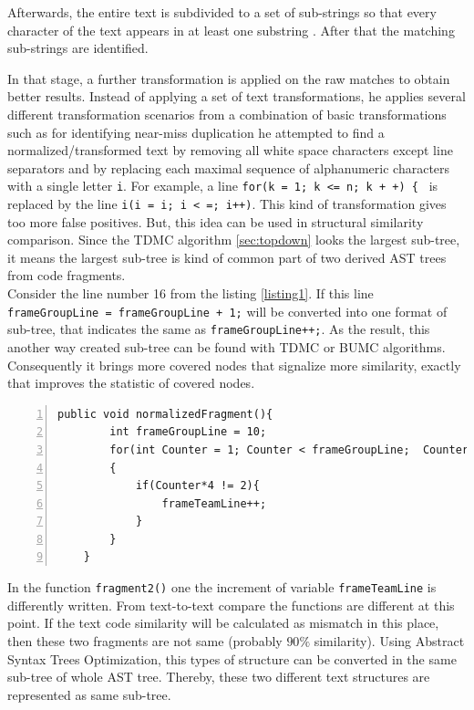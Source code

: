\documentclass{report}
\begin{document}
Afterwards, the entire text
is subdivided to a set of sub-strings so that every character of the text appears in at least
one substring \cite{software_clone_detection}. After that the matching sub-strings are identified. 

In that stage, a further transformation is applied on the raw matches to obtain better results. Instead of applying
a set of text transformations, he applies several different transformation scenarios
from a combination of basic transformations such as for identifying near-miss duplication he
attempted to find a normalized/transformed text by removing all white space characters
except line separators and by replacing each maximal sequence of alphanumeric characters
with a single letter \texttt{i}. For example, a line \texttt{for(k = 1; k <= n; k + +) \{ } is replaced by
the line \texttt{i(i = i; i < =; i++)}. This kind of transformation gives too more false positives. But, this idea can be used in structural similarity comparison. Since the TDMC algorithm \ref{sec:topdown} looks the largest sub-tree, it means the largest sub-tree is kind of common part of two derived AST trees from code fragments. \\
Consider the line number 16 from the listing \ref{listing1}. If this line \texttt{frameGroupLine = frameGroupLine + 1;} will be converted into one format of sub-tree, that indicates the same as \texttt{frameGroupLine++;}. As the result, this another way created sub-tree can be found with TDMC or BUMC algorithms. Consequently it brings more covered nodes that signalize more similarity, exactly that improves the statistic of covered nodes.

\begin{lstlisting}[caption= {Normalized function \texttt{normalizedFragment()} concerning variable \texttt {frameGroupLine}}, label = listing2, numbers=left, numbersep=-5pt]
	public void normalizedFragment(){
		int frameGroupLine = 10;
		for(int Counter = 1; Counter < frameGroupLine;  Counter =+ 2)
		{
			if(Counter*4 != 2){ 
				frameTeamLine++;
			}
		}
	}
\end{lstlisting}

In the function \texttt{fragment2()} one the increment of variable \texttt{frameTeamLine} is differently written. From text-to-text compare the functions are different at this point. If the text code similarity will be calculated as mismatch in this place, then these two fragments are not same (probably $90\%$ similarity). Using Abstract Syntax Trees Optimization, this types of structure can be converted in the same sub-tree of whole AST tree. Thereby, these two different text structures are represented as same sub-tree. 
\end{document}
